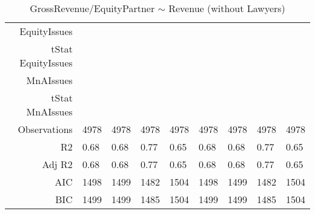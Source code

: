 \begin{table}[ht]
\begin{tabular}{rllllllll}
  EquityIssues &  &  &  &  &  &  &  &  \\ 
  tStat EquityIssues &  &  &  &  &  &  &  &  \\ 
  MnAIssues &  &  &  &  &  &  &  &  \\ 
  tStat MnAIssues &  &  &  &  &  &  &  &  \\ 
  Observations & 4978 & 4978 & 4978 & 4978 & 4978 & 4978 & 4978 & 4978 \\ 
  R2 & 0.68 & 0.68 & 0.77 & 0.65 & 0.68 & 0.68 & 0.77 & 0.65 \\ 
  Adj R2 & 0.68 & 0.68 & 0.77 & 0.65 & 0.68 & 0.68 & 0.77 & 0.65 \\ 
  AIC & 1498 & 1499 & 1482 & 1504 & 1498 & 1499 & 1482 & 1504 \\ 
  BIC & 1499 & 1499 & 1485 & 1504 & 1499 & 1499 & 1485 & 1504 \\ 
   \hline
\end{tabular}
\caption{GrossRevenue/EquityPartner $\sim$ Revenue (without Lawyers)} 
\end{table}
